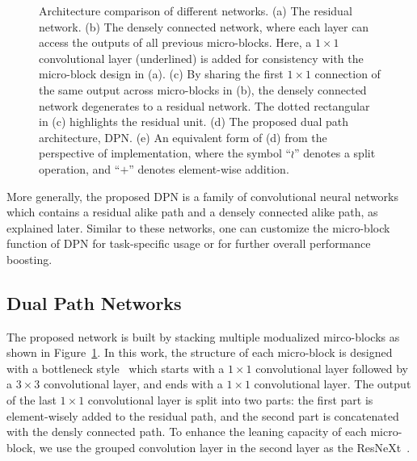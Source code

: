 \documentclass{article}
\begin{document}
\begin{figure}[t]	
	\vskip -0.1in
	\vskip -0.1in
	\caption{Architecture comparison of different networks. (a) The residual network. (b) The densely connected network, where each layer can access the outputs of all previous micro-blocks. Here, a $1\times1$ convolutional layer (underlined) is added for consistency with the micro-block design in (a). (c) By sharing the first $1\times1$ connection of the same output across micro-blocks in (b), the densely connected network degenerates to a residual network. The dotted rectangular in (c) highlights the residual unit. (d) The proposed dual path architecture, DPN. (e) An equivalent form of (d) from the perspective of implementation, where the symbol ``$\wr$'' denotes a split operation, and ``$+$'' denotes element-wise addition.}
	\label{fig_arch}
  \vskip -0.1in	
\end{figure}

More generally, the proposed DPN is a family of convolutional neural networks which contains a residual alike path and a densely connected alike path, as explained later. Similar to these networks, one can customize the micro-block function of DPN for task-specific usage or for further overall performance boosting.



\subsection{Dual Path Networks}

The proposed network is built by stacking multiple modualized mirco-blocks as shown in Figure~\ref{fig_arch}. In this work, the structure of each micro-block is designed with a bottleneck style~\cite{he2016deep} which starts with a $1\times1$ convolutional layer followed by a $3\times3$ convolutional layer, and ends with a $1\times1$ convolutional layer. The output of the last $1\times1$ convolutional layer is split into two parts: the first part is element-wisely added to the residual path, and the second part is concatenated with the densly connected path. To enhance the leaning capacity of each micro-block, we use the grouped convolution layer in the second layer as the ResNeXt~\citep{xie2016aggregated}.
\end{document}
